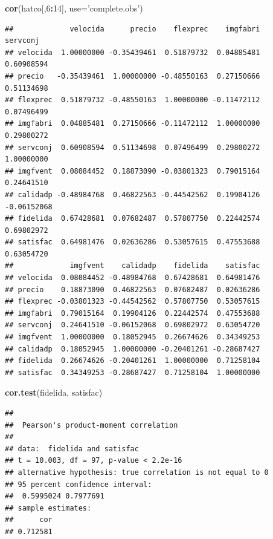\documentclass[]{book}
\newenvironment{Shaded}{\begin{snugshade}}{\end{snugshade}}
\newcommand{\KeywordTok}[1]{\textcolor[rgb]{0.13,0.29,0.53}{\textbf{#1}}}
\newcommand{\DataTypeTok}[1]{\textcolor[rgb]{0.13,0.29,0.53}{#1}}
\newcommand{\DecValTok}[1]{\textcolor[rgb]{0.00,0.00,0.81}{#1}}
\newcommand{\StringTok}[1]{\textcolor[rgb]{0.31,0.60,0.02}{#1}}
\newcommand{\OperatorTok}[1]{\textcolor[rgb]{0.81,0.36,0.00}{\textbf{#1}}}
\newcommand{\NormalTok}[1]{#1}
\begin{document}
\begin{Shaded}
\begin{Highlighting}[]
\KeywordTok{cor}\NormalTok{(hatco[,}\DecValTok{6}\OperatorTok{:}\DecValTok{14}\NormalTok{], }\DataTypeTok{use=}\StringTok{'complete.obs'}\NormalTok{)}
\end{Highlighting}
\end{Shaded}

\begin{verbatim}
##             velocida      precio    flexprec    imgfabri    servconj
## velocida  1.00000000 -0.35439461  0.51879732  0.04885481  0.60908594
## precio   -0.35439461  1.00000000 -0.48550163  0.27150666  0.51134698
## flexprec  0.51879732 -0.48550163  1.00000000 -0.11472112  0.07496499
## imgfabri  0.04885481  0.27150666 -0.11472112  1.00000000  0.29800272
## servconj  0.60908594  0.51134698  0.07496499  0.29800272  1.00000000
## imgfvent  0.08084452  0.18873090 -0.03801323  0.79015164  0.24641510
## calidadp -0.48984768  0.46822563 -0.44542562  0.19904126 -0.06152068
## fidelida  0.67428681  0.07682487  0.57807750  0.22442574  0.69802972
## satisfac  0.64981476  0.02636286  0.53057615  0.47553688  0.63054720
##             imgfvent    calidadp    fidelida    satisfac
## velocida  0.08084452 -0.48984768  0.67428681  0.64981476
## precio    0.18873090  0.46822563  0.07682487  0.02636286
## flexprec -0.03801323 -0.44542562  0.57807750  0.53057615
## imgfabri  0.79015164  0.19904126  0.22442574  0.47553688
## servconj  0.24641510 -0.06152068  0.69802972  0.63054720
## imgfvent  1.00000000  0.18052945  0.26674626  0.34349253
## calidadp  0.18052945  1.00000000 -0.20401261 -0.28687427
## fidelida  0.26674626 -0.20401261  1.00000000  0.71258104
## satisfac  0.34349253 -0.28687427  0.71258104  1.00000000
\end{verbatim}

\begin{Shaded}
\begin{Highlighting}[]
\KeywordTok{cor.test}\NormalTok{(fidelida, satisfac)}
\end{Highlighting}
\end{Shaded}

\begin{verbatim}
## 
##  Pearson's product-moment correlation
## 
## data:  fidelida and satisfac
## t = 10.003, df = 97, p-value < 2.2e-16
## alternative hypothesis: true correlation is not equal to 0
## 95 percent confidence interval:
##  0.5995024 0.7977691
## sample estimates:
##      cor 
## 0.712581
\end{verbatim}
\end{document}

